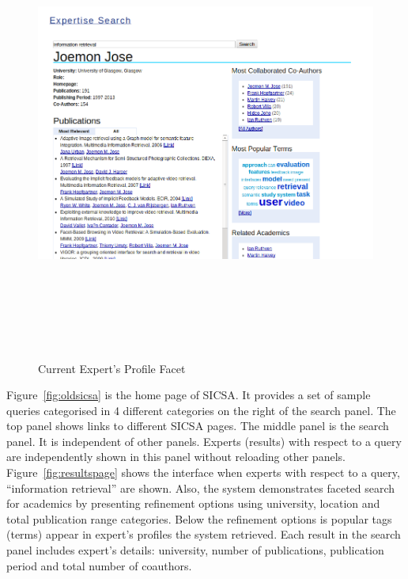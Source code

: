  \begin{figure}
 \centering
 \includegraphics[width=13cm,height=15cm,keepaspectratio]{./figures/oldProfilePage.png}
 \caption{Current Expert's Profile Facet} \label{fig:profilepage} 
\end{figure}
Figure~\ref{fig:oldsicsa} is the home page of SICSA. It provides a set of sample queries categorised in 4 different categories on the right of the 
search panel. The top panel shows links to different SICSA pages. The middle panel is the search panel. It is independent of other panels. 
Experts (results) with respect to a query are independently shown in this panel without reloading other panels. Figure~\ref{fig:resultspage} shows
the interface when experts with respect to a query, ``information retrieval'' are shown. Also, the system demonstrates 
faceted search for academics by presenting refinement options using university, location and total publication range categories.
Below the refinement options is popular tags (terms) appear in expert's profiles the system retrieved.
Each result in the search panel includes expert's details: university, number of publications, publication period and total number of coauthors.

